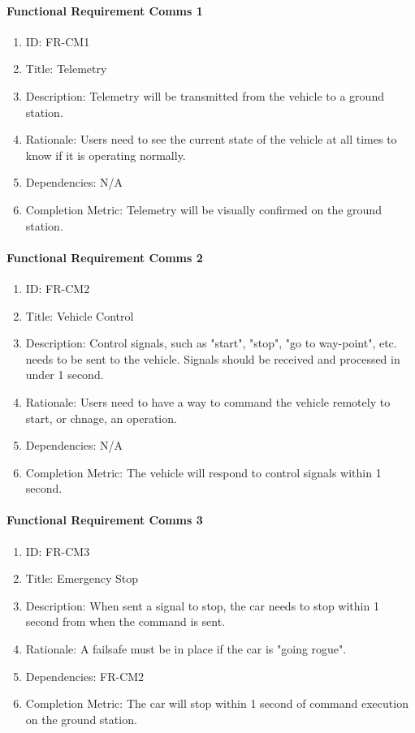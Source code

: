 \documentclass[compsoc,draftclsnofoot,onecolumn,10pt]{IEEEtran}
\begin{document}
	\paragraph{Functional Requirement Comms 1}
		\begin{enumerate}
			\item ID: FR-CM1
			\item Title: Telemetry
			\item Description: Telemetry will be transmitted from the vehicle to a ground station.
			\item Rationale: Users need to see the current state of the vehicle at all times to know if it is operating normally.
			\item Dependencies: N/A
			\item Completion Metric: Telemetry will be visually confirmed on the ground station.
		\end{enumerate}

	\paragraph{Functional Requirement Comms 2}
		\begin{enumerate}
			\item ID: FR-CM2
			\item Title: Vehicle Control
			\item Description: Control signals, such as "start", "stop", "go to way-point", etc. needs to be sent to the vehicle. Signals should be received and processed in under 1 second.
			\item Rationale: Users need to have a way to command the vehicle remotely to start, or chnage, an operation.
			\item Dependencies: N/A
			\item Completion Metric: The vehicle will respond to control signals within 1 second.
		\end{enumerate}
		
        \paragraph{Functional Requirement Comms 3}
			\begin{enumerate}
				\item ID: FR-CM3
				\item Title: Emergency Stop
				\item Description: When sent a signal to stop, the car needs to stop within 1 second from when the command is sent.
				\item Rationale: A failsafe must be in place if the car is "going rogue".
				\item Dependencies: FR-CM2
				\item Completion Metric: The car will stop within 1 second of command execution on the ground station.
			\end{enumerate}
\end{document}
